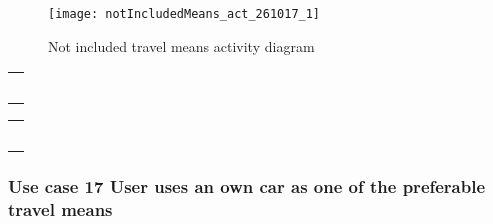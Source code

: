 \documentclass[a4paper,leqno]{book}
\begin{document}
\begin{figure}[!h]
	\begin{center}
		\texttt{[image: notIncludedMeans\_act\_261017\_1]}
	\end{center}
	\caption{Not included travel means activity diagram}
\end{figure}

\begin{tabular}[c]{@{}l@{}}\\ \\ \\ \\ \\ \\ \end{tabular}\newpage
\begin{tabular}[c]{@{}l@{}}\\ \\ \\ \\ \\ \\ \end{tabular}

\subsubsection{Use case 17 User uses an own car as one of the  preferable travel means}
\end{document}
